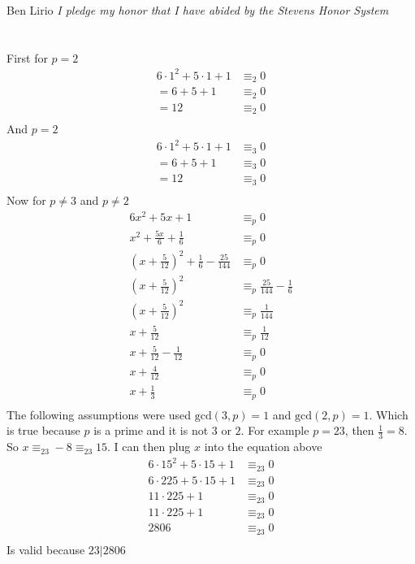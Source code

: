 \documentclass{article}
\begin{document}
Ben Lirio
\textit{I pledge my honor that I have abided by the Stevens Honor System}
\section{}
First for $p = 2$
\[
\begin{split}
6 \cdot 1^{2} + 5 \cdot 1 + 1 &\equiv_{2} 0 \\
= 6 + 5 + 1 &\equiv_{2} 0 \\ 
= 12 &\equiv_{2} 0 \\ 
\end{split}
\]
And $p = 2$
\[
\begin{split}
6 \cdot 1^{2} + 5 \cdot 1 + 1 &\equiv_{3} 0 \\
= 6 + 5 + 1 &\equiv_{3} 0 \\ 
= 12 &\equiv_{3} 0 \\ 
\end{split}
\]
Now for $p \ne 3$ and $p \ne 2$
\[
\begin{split}
6x^{2} + 5x + 1 &\equiv_{p} 0 \\
x^{2} + \frac{5x}{6} + \frac{1}{6} &\equiv_{p} 0 \\
(x + \frac{5}{12})^{2} + \frac{1}{6} - \frac{25}{144} &\equiv_{p} 0 \\
(x + \frac{5}{12})^{2} &\equiv_{p} \frac{25}{144} - \frac{1}{6} \\
(x + \frac{5}{12})^{2} &\equiv_{p} \frac{1}{144} \\
x + \frac{5}{12} &\equiv_{p} \frac{1}{12} \\
x + \frac{5}{12} - \frac{1}{12}&\equiv_{p} 0 \\
x + \frac{4}{12} &\equiv_{p} 0 \\
x + \frac{1}{3} &\equiv_{p} 0 \\
\end{split}
\]
The following assumptions were used $\textrm{gcd}(3, p) = 1$ and $\textrm{gcd}(2, p) = 1$.
Which is true because $p$ is a prime and it is not $3$ or $2$.
\newline
For example $p = 23$, then $\frac{1}{3} = 8$. So $x \equiv_{23} -8 \equiv_{23} 15$.
I can then plug $x$ into the equation above
\[
\begin{split}
6 \cdot 15^{2} + 5 \cdot 15 + 1 &\equiv_{23} 0 \\
6 \cdot 225 + 5 \cdot 15 + 1 &\equiv_{23} 0 \\
11 \cdot 225 + 1 &\equiv_{23} 0 \\
11 \cdot 225 + 1 &\equiv_{23} 0 \\
2806 &\equiv_{23} 0 \\
\end{split}
\]
Is valid because $23|2806$
\end{document}

